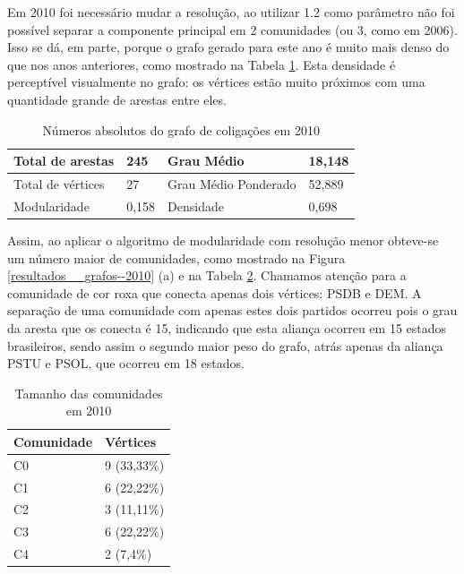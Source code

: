 Em 2010 foi necessário mudar a resolução, ao utilizar 1.2 como parâmetro não foi possível separar a componente principal em 2 comunidades (ou 3, como em 2006). Isso se dá, em parte, porque o grafo gerado para este ano é muito mais denso do que nos anos anteriores, como mostrado na Tabela \ref{table-2010a}. Esta densidade é perceptível visualmente no grafo: os vértices estão muito próximos com uma quantidade grande de arestas entre eles.

\begin{table}[H]
\centering
\label{table-2010a}
\begin{tabular}{|l|l|l|l|}
\hline
Total de arestas  & 245 & Grau Médio           & 18,148 \\ \hline
Total de vértices & 27 & Grau Médio Ponderado & 52,889 \\ \hline
Modularidade      & 0,158 & Densidade            & 0,698 \\ \hline
\end{tabular}
\caption{Números absolutos do grafo de coligações em 2010}
\end{table}

Assim, ao aplicar o algoritmo de modularidade com resolução menor obteve-se um número maior de comunidades, como mostrado na Figura \ref{resultados__grafos--2010} (a) e na Tabela \ref{table-2010b}. Chamamos atenção para a comunidade de cor roxa que conecta apenas dois vértices: \gls{PSDB} e \gls{DEM}. A separação de uma comunidade com apenas estes dois partidos ocorreu pois o grau da aresta que os conecta é 15, indicando que esta aliança ocorreu em 15 estados brasileiros, sendo assim o segundo maior peso do grafo, atrás apenas da aliança \gls{PSTU} e \gls{PSOL}, que ocorreu em 18 estados.

\begin{table}[H]
\centering
\label{table-2010b}
\begin{tabular}{|l|l|}
\hline
Comunidade & Vértices \\ \hline
C0         &     9 (33,33\%)                \\ \hline
C1         &     6 (22,22\%)                \\ \hline
C2         &       3 (11,11\%)               \\ \hline
C3         &       6 (22,22\%)               \\ \hline
C4         &       2 (7,4\%)               \\ \hline
\end{tabular}
\caption{Tamanho das comunidades em 2010}
\end{table}

